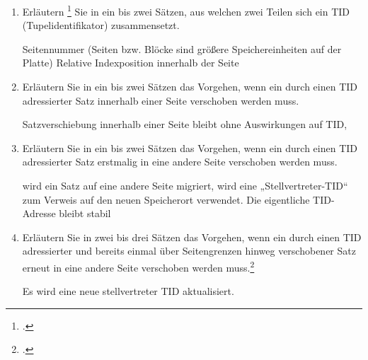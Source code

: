 \documentclass{bschlangaul-aufgabe}
\begin{document}

\begin{enumerate}
\item Erläutern \footcite[Thema 1
Teilaufgabe 2 Aufgabe 4]{examen:46116:2017:03} Sie in ein bis zwei
Sätzen, aus welchen zwei Teilen sich ein TID (Tupelidentifikator)
zusammensetzt.

\begin{bAntwort}
Seitennummer (Seiten bzw. Blöcke sind größere Speichereinheiten auf der
Platte) Relative Indexposition innerhalb der Seite
\end{bAntwort}

\item Erläutern Sie in ein bis zwei Sätzen das Vorgehen, wenn ein
durch einen TID adressierter Satz innerhalb einer Seite verschoben
werden muss.

\begin{bAntwort}
Satzverschiebung innerhalb einer Seite bleibt ohne Auswirkungen auf TID,
\end{bAntwort}

\item Erläutern Sie in ein bis zwei Sätzen das Vorgehen, wenn ein
durch einen TID adressierter Satz erstmalig in eine andere Seite
verschoben werden muss.

\begin{bAntwort}
wird ein Satz auf eine andere Seite migriert, wird eine
„Stellvertreter-TID“ zum Verweis auf den neuen Speicherort verwendet.
Die eigentliche TID-Adresse bleibt stabil
\end{bAntwort}

\item Erläutern Sie in zwei bis drei Sätzen das Vorgehen, wenn ein
durch einen TID adressierter und bereits einmal über Seitengrenzen
hinweg verschobener Satz erneut in eine andere Seite verschoben werden
muss.\footcite[Aufgabe 3]{db:pu:3}

\begin{bAntwort}
Es wird eine neue stellvertreter TID aktualisiert.
\end{bAntwort}
\end{enumerate}
\end{document}
